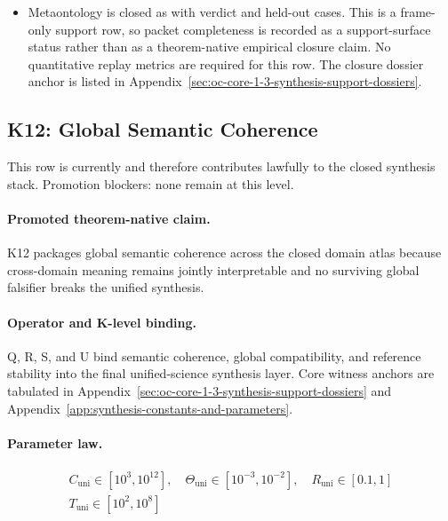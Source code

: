 \begin{itemize}[leftmargin=1.6em,nosep]
\item Metaontology is closed as  with verdict  and  held-out cases. This is a frame-only support row, so packet completeness is recorded as a support-surface status rather than as a theorem-native empirical closure claim. No quantitative replay metrics are required for this row. The closure dossier anchor is listed in Appendix~\ref{sec:oc-core-1-3-synthesis-support-dossiers}.
\end{itemize}

\subsection{K12: Global Semantic Coherence}
\label{sec:oc-core-1-3-synthesis-k12}
This row is currently  and therefore contributes lawfully to the closed synthesis stack.
Promotion blockers: none remain at this level.

\paragraph{Promoted theorem-native claim.}
K12 packages global semantic coherence across the closed domain atlas because cross-domain meaning remains jointly interpretable and no surviving global falsifier breaks the unified synthesis.

\paragraph{Operator and K-level binding.}
Q, R, S, and U bind semantic coherence, global compatibility, and reference stability into the final unified-science synthesis layer.
Core witness anchors are tabulated in Appendix~\ref{sec:oc-core-1-3-synthesis-support-dossiers} and Appendix~\ref{app:synthesis-constants-and-parameters}.

\paragraph{Parameter law.}
\[
\begin{gathered} C_{\mathrm{uni}} \in [10^3,10^{12}],\quad \Theta_{\mathrm{uni}} \in [10^{-3},10^{-2}],\quad R_{\mathrm{uni}} \in [0.1,1] \\ T_{\mathrm{uni}} \in [10^2,10^8] \end{gathered}
\]


